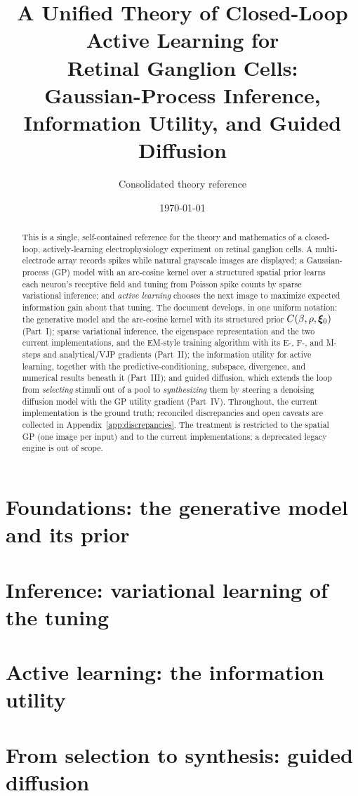 \documentclass[11pt]{article}
\title{A Unified Theory of Closed-Loop Active Learning for\\
Retinal Ganglion Cells:\\[2pt]
\large Gaussian-Process Inference, Information Utility, and Guided Diffusion}
\author{Consolidated theory reference}
\date{\today}
\begin{document}
\maketitle

\begin{abstract}
\noindent
This is a single, self-contained reference for the theory and mathematics of a
closed-loop, actively-learning electrophysiology experiment on retinal ganglion
cells. A multi-electrode array records spikes while natural grayscale images are
displayed; a Gaussian-process (GP) model with an arc-cosine kernel over a
structured spatial prior learns each neuron's receptive field and tuning from
Poisson spike counts by sparse variational inference; and \emph{active learning}
chooses the next image to maximize expected information gain about that tuning.
The document develops, in one uniform notation: the generative model and the
arc-cosine kernel with its structured prior $C(\beta,\rho,\bm{\xi}_{0})$
(Part~I); sparse variational inference, the eigenspace representation and the two
current implementations, and the EM-style training algorithm with its E-, F-, and
M-steps and analytical/VJP gradients (Part~II); the information utility for active
learning, together with the predictive-conditioning, subspace, divergence, and
numerical results beneath it (Part~III); and guided diffusion, which extends the
loop from \emph{selecting} stimuli out of a pool to \emph{synthesizing} them by
steering a denoising diffusion model with the GP utility gradient (Part~IV).
Throughout, the current implementation is the ground truth; reconciled
discrepancies and open caveats are collected in Appendix~\ref{app:discrepancies}.
The treatment is restricted to the spatial GP (one image per input) and to the
current implementations; a deprecated legacy engine is out of scope.
\end{abstract}

\tableofcontents
\clearpage



\part{Foundations: the generative model and its prior}


\part{Inference: variational learning of the tuning}



\part{Active learning: the information utility}



\part{From selection to synthesis: guided diffusion}


\appendix

\end{document}
